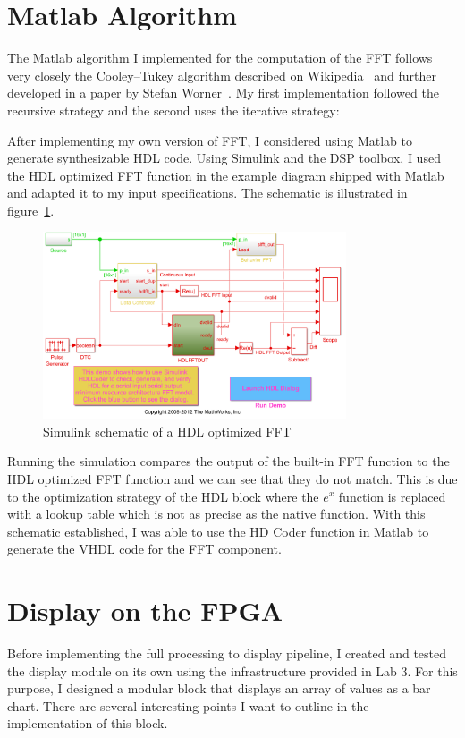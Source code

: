 \documentclass[letterpaper, titlepage, 11pt]{article}
\begin{document}
\section{Matlab Algorithm}
The Matlab algorithm I implemented for the computation of the FFT follows very closely the Cooley–Tukey algorithm described on Wikipedia~\cite{wiki_cooley} and further developed in a paper by Stefan Worner~\cite{fft_it}. My first implementation followed the recursive strategy and the second uses the iterative strategy:



After implementing my own version of FFT, I considered using Matlab to generate synthesizable HDL code. Using Simulink and the DSP toolbox, I used the HDL optimized FFT function in the example diagram shipped with Matlab and adapted it to my input specifications. The schematic is illustrated in figure~\ref{fig:simulink}.
\begin{figure}[!htb]
  \centering
  \includegraphics[width=0.8\textwidth]{sim2.PNG}
  \caption{Simulink schematic of a HDL optimized FFT}
  \label{fig:simulink}
\end{figure}

Running the simulation compares the output of the built-in FFT function to the HDL optimized FFT function and we can see that they do not match. This is due to the optimization strategy of the HDL block where the $e^x$ function is replaced with a lookup table which is not as precise as the native function. With this schematic established, I was able to use the HD Coder function in Matlab to generate the VHDL code for the FFT component.

\section{Display on the FPGA}
Before implementing the full processing to display pipeline, I created and tested the display module on its own using the infrastructure provided in Lab 3. For this purpose, I designed a modular block that displays an array of values as a bar chart. There are several interesting points I want to outline in the implementation of this block.
\end{document}
